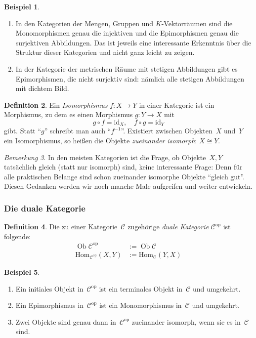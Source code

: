 \documentclass[a4paper,ngerman]{scrartcl}
\theoremstyle{definition}
\newtheorem{defn}{Definition}[section]
\newtheorem{bsp}[defn]{Beispiel}
\theoremstyle{plain}
\theoremstyle{remark}
\newtheorem{bem}[defn]{Bemerkung}
\newcommand{\C}{\mathcal{C}}
\newcommand{\Hom}{\mathrm{Hom}}
\newcommand{\id}{\mathrm{id}}
\DeclareMathOperator{\Ob}{Ob}
\newcommand{\op}{\mathrm{op}}
\begin{document}
\begin{bsp}\begin{enumerate}
\item In den Kategorien der Mengen, Gruppen und $K$-Vektorräumen sind die
Monomorphismen genau die injektiven und die Epimorphismen genau die
surjektiven Abbildungen. Das ist jeweils eine interessante Erkenntnis über die
Struktur dieser Kategorien und nicht ganz leicht zu zeigen.
\item In der Kategorie der metrischen Räume mit stetigen Abbildungen gibt es
Epimorphismen, die nicht surjektiv sind: nämlich alle stetigen Abbildungen mit
dichtem Bild.
\end{enumerate}\end{bsp}

\begin{defn}
Ein \emph{Isomorphismus} $f:X \to Y$ in einer Kategorie ist ein
Morphismus, zu dem es einen Morphismus $g:Y \to X$ mit
\[ g \circ f = \id_X, \quad f \circ g = \id_Y \]
gibt. Statt "`$g$"' schreibt man auch "`$f^{-1}$"'. Existiert zwischen
Objekten~$X$ und~$Y$ ein Isomorphismus, so heißen die Objekte \emph{zueinander
isomorph}:
$X \cong Y$.
\end{defn}

\begin{bem}\label{gleichheitobj}In den meisten Kategorien ist die Frage, ob
Objekte~$X,Y$ tatsächlich gleich (statt nur isomorph) sind, keine interessante
Frage: Denn für alle praktischen Belange sind schon zueinander isomorphe
Objekte "`gleich gut"'. Diesen Gedanken werden wir noch manche Male aufgreifen
und weiter entwickeln.\end{bem}


\subsubsection*{Die duale Kategorie}

\begin{defn}
Die zu einer Kategorie~$\C$ zugehörige \emph{duale Kategorie} $\C^\op$ ist
folgende:
\begin{align*}
  \Ob \C^\op &:= \Ob \C \\
  \Hom_{\C^\op}(X,Y) &:= \Hom_\C(Y,X)
\end{align*}
\end{defn}

\begin{bsp}\begin{enumerate}
\item Ein initiales Objekt in~$\C^\op$ ist ein terminales Objekt in~$\C$ und
umgekehrt.
\item Ein Epimorphismus in~$\C^\op$ ist ein Monomorphismus in~$\C$ und
umgekehrt.
\item Zwei Objekte sind genau dann in~$\C^\op$ zueinander isomorph, wenn sie es
in~$\C$ sind.
\end{enumerate}\end{bsp}
\end{document}
